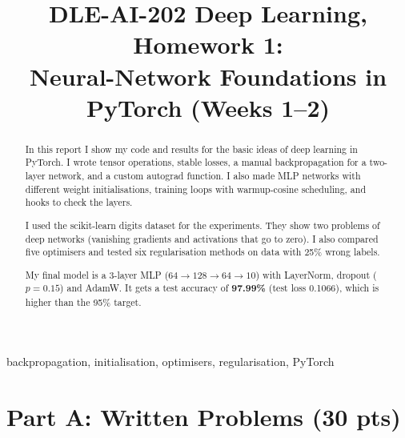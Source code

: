 \documentclass[conference,a4paper]{IEEEtran}
\begin{document}
\title{DLE-AI-202 Deep Learning, Homework 1:\\
Neural-Network Foundations in PyTorch (Weeks 1--2)}

\author{
}

\maketitle

\begin{abstract}
In this report I show my code and results for the basic ideas of deep learning in PyTorch. I wrote tensor operations, stable losses, a manual backpropagation for a two-layer network, and a custom autograd function. I also made MLP networks with different weight initialisations, training loops with warmup-cosine scheduling, and hooks to check the layers.

I used the scikit-learn digits dataset for the experiments. They show two problems of deep networks (vanishing gradients and activations that go to zero). I also compared five optimisers and tested six regularisation methods on data with 25\% wrong labels.

My final model is a 3-layer MLP ($64\to128\to64\to10$) with LayerNorm, dropout ($p=0.15$) and AdamW. It gets a test accuracy of \textbf{97.99\%} (test loss 0.1066), which is higher than the 95\% target.
\end{abstract}

\begin{IEEEkeywords}
backpropagation, initialisation, optimisers, regularisation, PyTorch
\end{IEEEkeywords}

\section{Part A: Written Problems (30 pts)}
\end{document}
